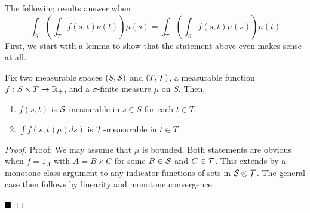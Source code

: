 The following results answer when
\[ \int_{S}\left(\int_{T} f(s, t) \nu(t)\right)\mu(s) = \int_{T}\left(\int_{S} f(s, t)\mu(s)\right)\mu(t) \]
First, we start with a lemma to show that the statement above even makes sense at all.
\begin{lemma}
    Fix two measurable spaces $(S, \cal{S})$ and $(T, \cal{T})$, a measurable function $f : S \times T \to \R_{+}$, and a $\sigma$-finite measure $\mu$ on $S$. Then,
    \begin{enumerate}
        \item $f(s, t)$ is $\cal{S}$ measurable in $s \in S$ for each $t \in T$.
        \item $\int f(s, t)\mu(ds)$ is $\cal{T}$-measurable in $t \in T$. 
    \end{enumerate}
\end{lemma}
\begin{proof}{Proof:}
    We may assume that $\mu$ is bounded. Both statements are obvious when $f = 1_{A}$ with $A = B \times C$ for some $B \in \cal{S}$ and $C \in \cal{T}$. This extends by a monotone class argument to any indicator functions of sets in $\cal{S} \otimes \cal{T}$. The general case then follows by linearity and monotone convergence. 

    $\qed$
\end{proof}

